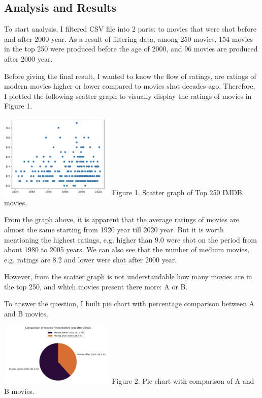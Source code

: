 \documentclass[10pt]{article}
\begin{document}
\begin{multicols}{2}
\section*{\centering \normalsize  Analysis and Results}
    \footnotesize{
        To start analysis, I filtered CSV file into 2 parts: to movies that were shot before and after 2000 year.
        As a result of filtering data, among 250 movies, 154 movies in the top 250 were produced before the age of 2000, 
        and 96 movies are produced after 2000 year.
        \par Before giving the final result, I wanted to know the flow of ratings, are ratings of modern movies higher or lower compared to movies shot decades ago.
        Therefore, I plotted the following scatter graph to visually display the ratings of movies in Figure 1.
        \begin{center}
            \includegraphics[width=5.5cm, height=4cm]{top_250_movies.png}
            Figure 1. Scatter graph of Top 250 IMDB movies.
        \end{center}

        \par From the graph above, it is apparent that the average ratings of movies are almost the same starting from 1920 year till 2020 year.
        But it is worth mentioning the highest ratings, e.g. higher than 9.0 were shot on the period from about 1980 to 2005 years.
        We can also see that the number of medium movies, e.g. ratings are 8.2 and lower were shot after 2000 year.

        However, from the scatter graph is not understandable how many movies are in the top 250, and which movies present there more: A or B.

        To answer the question, I built pie chart with percentage comparison between A and B movies.
        
        \begin{center}
            \includegraphics[width=5.5cm, height=3cm]{comparison.png}
            Figure 2. Pie chart with comparison of A and B movies.
        \end{center}
    }


\end{multicols}
\end{document}
